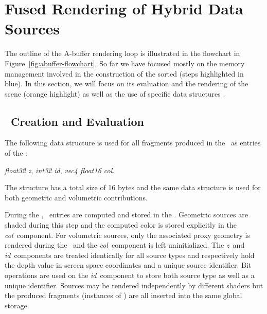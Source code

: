 \documentclass{egpubl}
\newcommand{\ab}{\mbox{A-buffer}}
\begin{document}
\section{Fused Rendering of Hybrid Data Sources}
\label{sec:fusion}

The outline of the \ab{} rendering loop is illustrated in the flowchart in Figure~\ref{fig:abuffer-flowchart}. 
So far we have focused mostly on the memory management involved in the construction of the sorted \bFraglist{} (steps highlighted in blue). 
In this section, we will focus on its evaluation and the rendering of the scene (orange highlight) as well as the use of specific data structures . 

\newcommand{\ccz}{\emph{z}}
\newcommand{\ccid}{\emph{id}}
\newcommand{\cccol}{\emph{col}}

\subsection{\bFraglist\ Creation and Evaluation}

The following data structure is used for all fragments produced in the \sFill\ as entries of the \bFraglist:
\begin{description}[font=\normalfont\itshape]
\item[\abs:] \emph{float32 z}, \emph{int32 id}, \emph{vec4 float16 col}.
\end{description}
The structure has a total size of 16 bytes and the same data structure is used for both geometric and volumetric contributions. 

During the \sFill, \abs\ entries are computed and stored in the \bFraglist. 
Geometric sources are shaded during this step and the computed color is stored explicitly in the \cccol\ component. 
For volumetric sources, only the associated proxy geometry is rendered during the \sFill\ and the \cccol\ component is left uninitialized. 
The \ccz\ and \ccid\ components are treated identically for all source types and respectively hold the depth value in screen space coordinates and a unique source identifier. 
Bit operations are used on the \ccid\ component to store both source type as well as a unique identifier. 
Sources may be rendered independently by different shaders but the produced fragments (instances of \abs) are all inserted into the same global storage.
\end{document}
